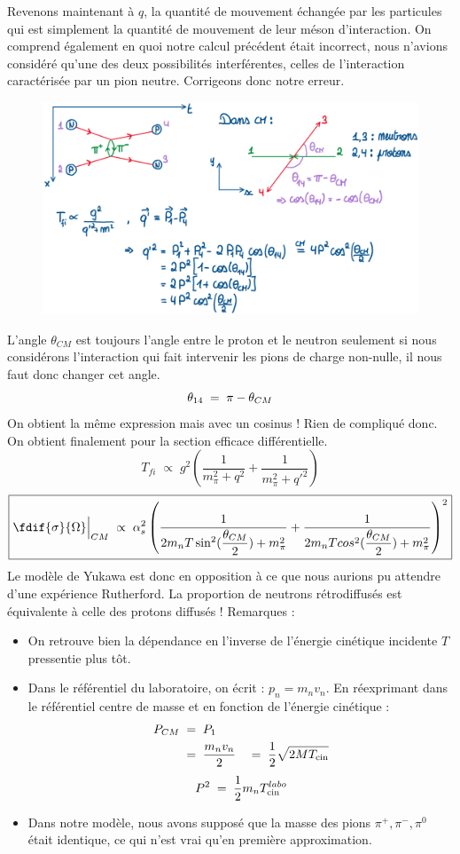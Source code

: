 Revenons maintenant à $q$, la quantité de mouvement échangée par les particules qui est simplement la quantité de mouvement de leur méson d'interaction. On comprend également en quoi notre calcul précédent était incorrect, nous n'avions considéré qu'une des deux possibilités interférentes, celles de l'interaction caractérisée par un pion neutre. Corrigeons donc notre erreur.\\
\begin{figure}[H]
    \centering
    \includegraphics[scale = 0.4]{Images4/Feynmann_pi2.png}
\end{figure}
L'angle $\theta_{CM}$ est toujours l'angle entre le proton et le neutron seulement si nous considérons l'interaction qui fait intervenir les pions de charge non-nulle, il nous faut donc changer cet angle.
\[
    \theta_{14} \; = \; \pi - \theta_{CM}
\]
On obtient la même expression mais avec un cosinus ! Rien de compliqué donc. On obtient finalement pour la section efficace différentielle.
\[
    \boxed{
        T_{fi} \; \propto\; g^2 \left(\dfrac{1}{m_\pi^2 + q^2} + \dfrac{1}{m_\pi^2 + q'^2}\right)
    }
\]
\[
    \boxed{
        \fdif{\sigma}{\Omega}\Big|_{CM} \;\propto\;\alpha_s^2 \left(\dfrac{1}{2m_n T \sin^2(\dfrac{\theta_{CM}}{2})+m^2_\pi} + \dfrac{1}{2m_n T cos^2(\dfrac{\theta_{CM}}{2})+m^2_\pi}\right)^2
    }
\]
Le modèle de Yukawa est donc en opposition à ce que nous aurions pu attendre d'une expérience Rutherford. La proportion de neutrons rétrodiffusés est équivalente à celle des protons diffusés !
Remarques :
\begin{itemize}[label = $\bullet$]
    \item On retrouve bien la dépendance en l'inverse de l'énergie cinétique incidente $T$ pressentie plus tôt.
    \item Dans le référentiel du laboratoire, on écrit : $p_n = m_n v_n$. En réexprimant dans le référentiel centre de masse et en fonction de l'énergie cinétique :
    \begin{align*}
        P_{CM} & \; = \; P_1\\
        &\; = \; \dfrac{m_n v_n}{2}
        & \; = \;\dfrac{1}{2}\sqrt{2M T_\text{cin}}
    \end{align*}
    \[
        P^2 \; = \; \dfrac{1}{2}m_n T_\text{cin}^{labo}
    \]
    \item Dans notre modèle, nous avons supposé que la masse des pions $\pi^+,\pi^-,\pi^0$ était identique, ce qui n'est vrai qu'en première approximation.
\end{itemize}
